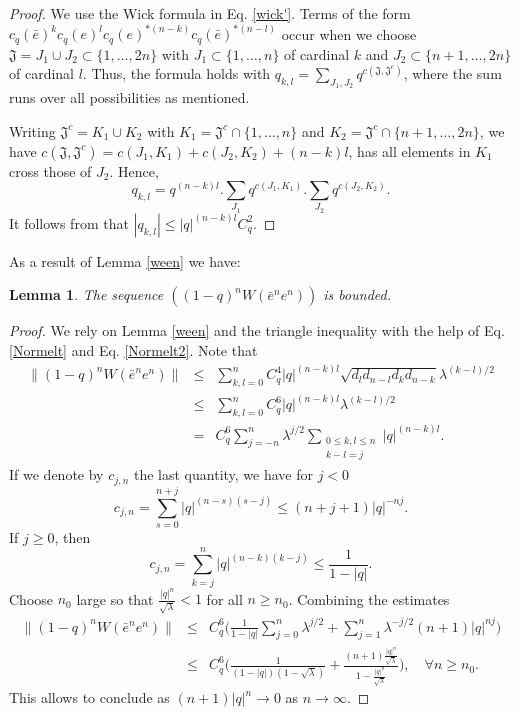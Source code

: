 \documentclass[12pt, a4paper,reqno]{amsart}
\newtheorem{Lemma}[Theorem]{Lemma}
\theoremstyle{definition}
\renewcommand{\leq}{\leqslant}
\renewcommand{\geq}{\geqslant}
\newcommand{\abs}[1]{\left\vert#1\right\vert}
\begin{document}
\begin{proof}
We use the Wick formula in Eq. \eqref{wick'}. Terms of the form $c_q(\bar e)^kc_q( e)^l c_q(e)^{* {(n-k)}}c_q(\bar e)^{*(n-l)}$ occur when we choose $\mathfrak{J}=J_1\cup J_2\subset\{1,\ldots,2n\}$ with $J_1\subset\{1,\ldots,n\}$ of cardinal $k$ and $J_2\subset \{n+1,\ldots,2n\}$ of cardinal $l$. Thus, the formula holds with $q_{k,l}=\sum_{J_1,J_2}q^{c(\mathfrak{J},\mathfrak{J}^c)}$, where the sum runs over all possibilities as mentioned.

Writing $\mathfrak{J}^c=K_1\cup K_2$ with 
$K_1=\mathfrak{J}^c\cap  \{1,\ldots,n\}$ and $K_2=\mathfrak{J}^c\cap  \{n+1,\ldots,2n\}$, we have 
$c(\mathfrak{J},\mathfrak{J}^c)=c(J_1,K_1)+c(J_2,K_2)+(n-k)l$, has all elements in $K_1$ cross those of $J_2$. Hence, 
$$q_{k,l}= q^{(n-k)l}. \sum_{J_1} q^{c(J_1,K_1)}. \sum_{J_2} q^{c(J_2,K_2)}.$$
It follows from \cite{B99} that $|q_{k,l}|\leq   |q|^{(n-k)l} C_q^2$. 
\end{proof}

As a result of Lemma \ref{ween} we have:
  
\begin{Lemma}\label{bnd2}
The sequence $((1-q)^{n}W({\bar e}^{ n} e^{  n}))$ is  bounded.	
\end{Lemma}

\begin{proof}
We rely on Lemma \ref{ween} and the triangle inequality with the help of 
Eq. \eqref{Normelt} and Eq. \eqref{Normelt2}. Note that 
\begin{eqnarray*}
\| (1-q)^{n}W({\bar e}^{ n} e^{  n})\|&\leq& \sum_{k,l=0}^n C_q^4 |q|^{(n-k)l}\sqrt{d_l d_{n-l}d_k d_{n-k}}\lambda ^{(k-l)/2} \\ 
&\leq& \sum_{k,l=0}^n C_q^6 |q|^{(n-k)l}\lambda ^{(k-l)/2}\\
& =& C_q^6\sum_{j=-n}^n  \lambda^{j/2} \sum_{\substack{0\leq k,l\leq n \\ k-l=j}} |q|^{(n-k)l}.
\end{eqnarray*}
If we denote by $c_{j,n}$ the last quantity, we have for $j<0$
$$c_{j,n}= \sum_{s=0}^{n+j} |q|^{(n-s)(s-j)}\leq (n+j+1) |q|^{-nj}.$$
If $j\geq 0$, then $$c_{j,n}= \sum_{k=j}^{n} |q|^{(n-k)(k-j)}\leq \frac 1 {1-|q|}.$$
Choose $n_0$ large so that $\frac{\abs{q}^n}{\sqrt{\lambda}}<1$ for all $n\geq n_0$. 
Combining the estimates
\begin{eqnarray*}
\| (1-q)^{n}W({\bar e}^{ n} e^{ n})\|&\leq& C_q^6\Big( \frac 1{1-|q|}\sum_{j=0}^n \lambda^{j/2} + \sum_{j=1}^n \lambda^{-j/2}(n+1) \abs{q}^{nj}\Big)\\ 
&\leq &C_q^6\Big( \frac 1{(1-|q|)(1-\sqrt{\lambda})} +\frac {(n+1) \frac{|q|^n}{\sqrt{\lambda}}}
{1-\frac{|q|^n}{\sqrt{\lambda}}}\Big),\quad \forall n\geq n_0.\end{eqnarray*}
This allows to conclude as $(n+1)\abs{q}^n\rightarrow 0$ as $n\rightarrow\infty$.
\end{proof}
\end{document}
